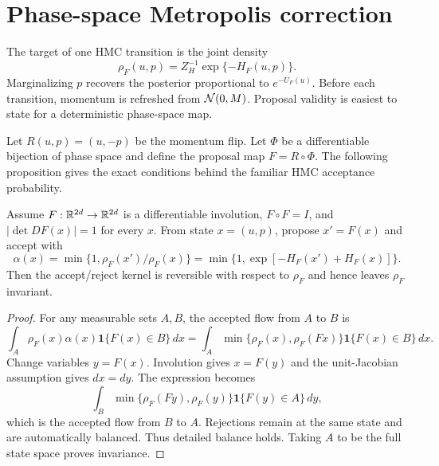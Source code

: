 \section{Phase-space Metropolis correction}
\label{sec:bf-hnn-phase-space-mh}

The target of one HMC transition is the joint density
\begin{equation}
 \rho_F(u,p)=Z_H^{-1}\exp\{-H_F(u,p)\}.
 \label{eq:bf-hnn-joint-target}
\end{equation}
Marginalizing $p$ recovers the posterior proportional to $e^{-U_F(u)}$.
Before each transition, momentum is refreshed from $\mathcal{N}(0,M)$.  Proposal
validity is easiest to state for a deterministic phase-space map.

Let $R(u,p)=(u,-p)$ be the momentum flip.  Let $\Phi$ be a differentiable
bijection of phase space and define the proposal map $F=R\circ\Phi$.  The
following proposition gives the exact conditions behind the familiar HMC
acceptance probability.

\begin{proposition}
\label{prop:bf-hnn-deterministic-mh}
Assume $F:\mathbb{R}^{2d}\to\mathbb{R}^{2d}$ is a differentiable involution,
$F\circ F=I$, and $|\det DF(x)|=1$ for every $x$.  From state $x=(u,p)$,
propose $x'=F(x)$ and accept with
\begin{equation}
 \alpha(x)=\min\{1,\rho_F(x')/\rho_F(x)\}
 =\min\{1,\exp[-H_F(x')+H_F(x)]\}.
 \label{eq:bf-hnn-true-energy-acceptance}
\end{equation}
Then the accept/reject kernel is reversible with respect to $\rho_F$ and hence
leaves $\rho_F$ invariant.
\end{proposition}

\begin{proof}
For any measurable sets $A,B$, the accepted flow from $A$ to $B$ is
\begin{equation}
 \int_A \rho_F(x)\alpha(x)\mathbf1\{F(x)\in B\}\,dx
 =\int_A\min\{\rho_F(x),\rho_F(Fx)\}
   \mathbf1\{F(x)\in B\}\,dx.
\end{equation}
Change variables $y=F(x)$.  Involution gives $x=F(y)$ and the unit-Jacobian
assumption gives $dx=dy$.  The expression becomes
\begin{equation}
 \int_B\min\{\rho_F(Fy),\rho_F(y)\}
   \mathbf1\{F(y)\in A\}\,dy,
\end{equation}
which is the accepted flow from $B$ to $A$.  Rejections remain at the same
state and are automatically balanced.  Thus detailed balance holds.  Taking
$A$ to be the full state space proves invariance.
\end{proof}

